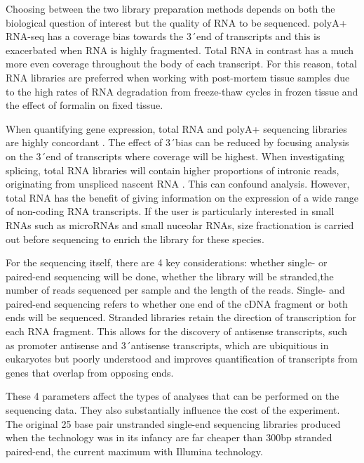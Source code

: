 Choosing between the two library preparation methods depends on both the biological question of interest but the quality of RNA to be sequenced.
polyA+ RNA-seq has a coverage bias towards the 3\'\ end of transcripts and this is exacerbated when RNA is highly fragmented.  
Total RNA in contrast has a much more even coverage throughout the body of each transcript.
For this reason, total RNA libraries are preferred when working with post-mortem tissue samples due to the high rates of RNA degradation from freeze-thaw cycles in frozen tissue and the effect of formalin on fixed tissue.

When quantifying gene expression, total RNA and polyA+ sequencing libraries are highly concordant \citep{Cui2010,Zhao2018}. 
The effect of 3\'\ bias can be reduced by focusing analysis on the 3\'\ end of transcripts where coverage will be highest. 
When investigating splicing, total RNA libraries will contain higher proportions of intronic reads, originating from unspliced nascent RNA \citep{Ameur2011}.
This can confound analysis. 
However, total RNA has the benefit of giving information on the expression of a wide range of non-coding RNA transcripts. 
If the user is particularly interested in small RNAs such as microRNAs and small nuceolar RNAs, size fractionation is carried out before sequencing to enrich the library for these species.

For the sequencing itself, there are 4 key considerations: whether single- or paired-end sequencing will be done, whether the library will be stranded,the number of reads sequenced per sample and the length of the reads.
Single- and paired-end sequencing refers to whether one end of the cDNA fragment or both ends will be sequenced.
Stranded libraries retain the direction of transcription for each RNA fragment.
This allows for the discovery of antisense transcripts, such as promoter antisense and 3\'\ antisense transcripts, which are ubiquitious in eukaryotes but poorly understood \citep{Lavorgna2004} and improves quantification of transcripts from genes that overlap from opposing ends. 

These 4 parameters affect the types of analyses that can be performed on the sequencing data.
They also substantially influence the cost of the experiment.
The original 25 base pair unstranded single-end sequencing libraries produced when the technology was in its infancy \citep{Mortazavi2008} are far cheaper than 300bp stranded paired-end, the current maximum with Illumina technology. 

